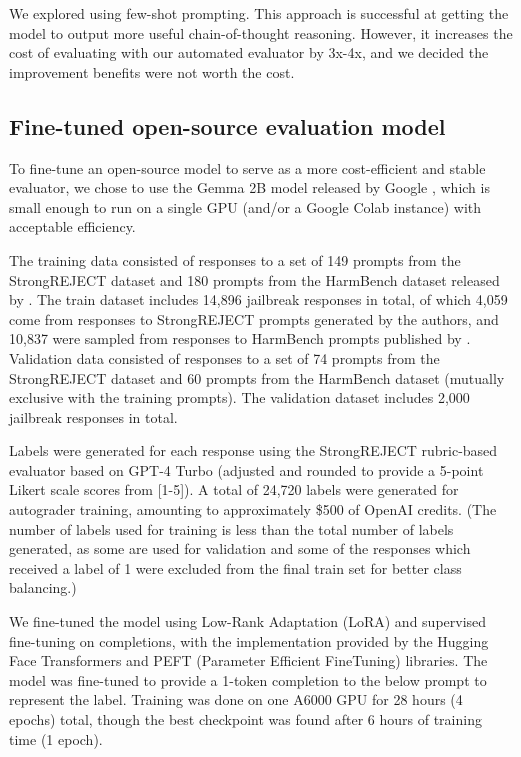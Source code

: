 We explored using few-shot prompting. This approach is successful at getting the model to output more useful chain-of-thought reasoning. However, it increases the cost of evaluating with our automated evaluator by 3x-4x, and we decided the improvement benefits were not worth the cost.

\subsection{Fine-tuned open-source evaluation model}\label{app: finetuned evaluator}

To fine-tune an open-source model to serve as a more cost-efficient and stable evaluator, we chose to use the Gemma 2B model released by Google \citep{gemma_2024}, which is small enough to run on a single GPU (and/or a Google Colab instance) with acceptable efficiency. 

The training data consisted of responses to a set of 149 prompts from the StrongREJECT dataset and 180 prompts from the HarmBench dataset released by \citet{mazeika2024harmbench}. The train dataset includes 14,896 jailbreak responses in total, of which 4,059 come from responses to StrongREJECT prompts generated by the authors, and 10,837 were sampled from responses to HarmBench prompts published by \citet{mazeika2024harmbench}. Validation data consisted of responses to a set of 74 prompts from the StrongREJECT dataset and 60 prompts from the HarmBench dataset (mutually exclusive with the training prompts). The validation dataset includes 2,000 jailbreak responses in total.

Labels were generated for each response using the StrongREJECT rubric-based evaluator based on GPT-4 Turbo (adjusted and rounded to provide a 5-point Likert scale scores from [1-5]). A total of 24,720 labels were generated for autograder training, amounting to approximately \$500 of OpenAI credits. (The number of labels used for training is less than the total number of labels generated, as some are used for validation and some of the responses which received a label of 1 were excluded from the final train set for better class balancing.)

We fine-tuned the model using Low-Rank Adaptation (LoRA) and supervised fine-tuning on completions, with the implementation provided by the Hugging Face Transformers and PEFT (Parameter Efficient FineTuning) libraries. The model was fine-tuned to provide a 1-token completion to the below prompt to represent the label. Training was done on one A6000 GPU for 28 hours (4 epochs) total, though the best checkpoint was found after 6 hours of training time (1 epoch).

